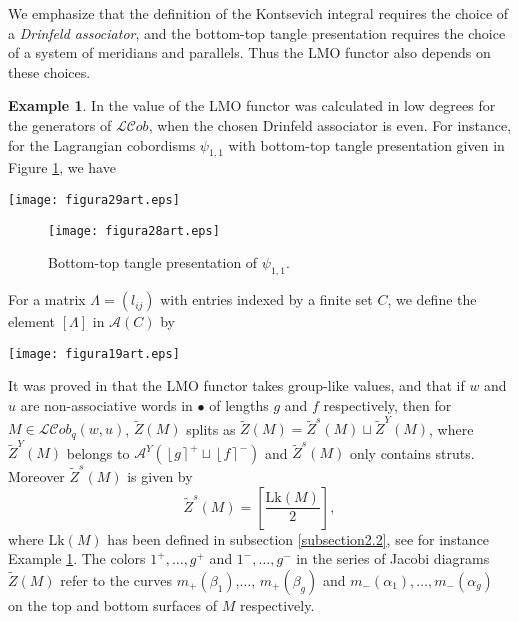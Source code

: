 \documentclass[10pt]{amsart}
\numberwithin{equation}{section}
\numberwithin{equation}{section}
\theoremstyle{definition}
\newtheorem{example}[theorem]{Example}
\begin{document}
We emphasize that the definition of the Kontsevich integral requires the choice of a \emph{Drinfeld associator}, and the bottom-top tangle presentation requires the choice of a system of meridians and parallels.  Thus the LMO functor also depends on these choices.

\begin{example}\label{examplepsi} In \cite[Section 5.3]{MR2403806} the value of the LMO functor was calculated  in low degrees for the generators of $\mathcal{LC}ob$, when the chosen Drinfeld associator is even. For instance, for the Lagrangian cobordisms $\psi_{1,1}$ with bottom-top tangle presentation given in Figure \ref{figura4.28}, we have 

\medskip

\centerline{\texttt{[image: figura29art.eps]}}

\medskip

\begin{figure}[ht!] 
										\centering
                        \texttt{[image: figura28art.eps]}
												\caption{Bottom-top tangle presentation of $\psi_{1,1}$.}
												\label{figura4.28}
\end{figure}
\end{example}


For a matrix $\Lambda=(l_{ij})$ with entries indexed by a finite set $C$, we define the element $\left[\Lambda\right]$ in $\mathcal{A}(C)$ by

\centerline{\texttt{[image: figura19art.eps]}}

It was proved in \cite[Lemma 4.12]{MR2403806} that the LMO functor takes group-like values, and that if $w$ and $u$ are non-associative words in  $\bullet$ of lengths $g$ and $f$ respectively, then for $M\in\mathcal{LC}ob_q(w,u)$, $\widetilde{Z}(M)$ splits as $\widetilde{Z}(M)=\widetilde{Z}^s(M)\sqcup\widetilde{Z}^Y(M)$, where $\widetilde{Z}^Y(M)$ belongs to $\mathcal{A}^Y(\left\lfloor g\right\rceil^+\sqcup\left\lfloor f\right\rceil^{-})$ and $\widetilde{Z}^s(M)$ only contains struts. Moreover $\widetilde{Z}^s(M)$  is given by
\begin{equation}\label{struteqn}
 \widetilde{Z}^s(M)=\left[\frac{\text{Lk}(M)}{2}\right], 
\end{equation}
where $\text{Lk}(M)$ has been defined in subsection \ref{subsection2.2}, see for instance Example \ref{examplepsi}. The colors $1^+,\ldots,g^+$ and $1^-,\ldots,g^-$ in the series of Jacobi diagrams $\widetilde{Z}(M)$ refer to the curves $m_+(\beta_1)$,$\ldots$, $m_+(\beta_g)$ and $m_-(\alpha_1),\ldots, m_-(\alpha_g)$ on the top and bottom surfaces of $M$ respectively.
\end{document}
